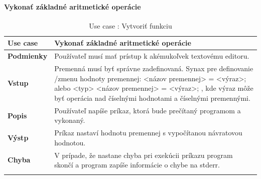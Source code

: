 \paragraph{Vykonať základné aritmetické operácie}
\begin{center}
	\begin{longtable}{|p{2.5cm}|p{14cm}|}
		
			\hline
			\textbf{Use case} & Vykonať základné aritmetické operácie \\ 
			\hline
			\textbf{Podmienky} & Používateľ musí mať prístup k akémukoľvek textovému editoru.  \\ 
			\hline
			\textbf{Vstup} & Premenná musí byť správne zadefinovaná. 
			\newline
			Synax pre definovanie /zmenu hodnoty premennej: 
			\newline
			<názov premennej> = <výraz>; alebo 
			\newline
			<typ> <názov premennej> = <výraz>;
			\newline
			, kde výraz môže byť operácia nad číselnými hodnotami a číselnými premennými. \\
			\hline
			\textbf{Popis} & Používateľ napíše príkaz, ktorá bude prečítaný programom a vykonaný.\\ 
			\hline
			\textbf{Výstp} & Príkaz nastaví hodnotu premennej s vypočítanou návratovou hodnotou.\\
			\hline
			\textbf{Chyba} & V prípade, že nastane chyba pri exekúcii príkazu program skončí a program zapíše informácie o chybe na stderr.\\
			\hline
		\caption{Use case : Vytvoriť funkciu}
		\label{table:1}
		
	\end{longtable}
\end{center}

